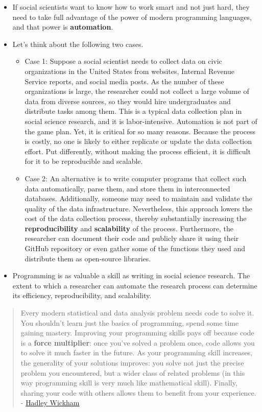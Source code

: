 \documentclass[
]{book}
\begin{document}
\begin{itemize}
\item
  If social scientists want to know how to work smart and not just hard, they need to take full advantage of the power of modern programming languages, and that power is \textbf{automation}.
\item
  Let's think about the following two cases.

  \begin{itemize}
  \item
    Case 1: Suppose a social scientist needs to collect data on civic organizations in the United States from websites, Internal Revenue Service reports, and social media posts. As the number of these organizations is large, the researcher could not collect a large volume of data from diverse sources, so they would hire undergraduates and distribute tasks among them. This is a typical data collection plan in social science research, and it is labor-intensive. Automation is not part of the game plan. Yet, it is critical for so many reasons. Because the process is costly, no one is likely to either replicate or update the data collection effort. Put differently, without making the process efficient, it is difficult for it to be reproducible and scalable.
  \item
    Case 2: An alternative is to write computer programs that collect such data automatically, parse them, and store them in interconnected databases. Additionally, someone may need to maintain and validate the quality of the data infrastructure. Nevertheless, this approach lowers the cost of the data collection process, thereby substantially increasing the \textbf{reproducibility} and \textbf{scalability} of the process. Furthermore, the researcher can document their code and publicly share it using their GitHub repository or even gather some of the functions they used and distribute them as open-source libraries.
  \end{itemize}
\item
  Programming is as valuable a skill as writing in social science research. The extent to which a researcher can automate the research process can determine its efficiency, reproducibility, and scalability.
\end{itemize}

\begin{quote}
Every modern statistical and data analysis problem needs code to solve it. You shouldn't learn just the basics of programming, spend some time gaining mastery. Improving your programming skills pays off because code is a \textbf{force multiplier}: once you've solved a problem once, code allows you to solve it much faster in the future. As your programming skill increases, the generality of your solutions improves: you solve not just the precise problem you encountered, but a wider class of related problems (in this way programming skill is very much like mathematical skill). Finally, sharing your code with others allows them to benefit from your experience. - \href{https://imstat.org/2014/12/16/hadley-wickham-impact-the-world-by-being-useful/}{Hadley Wickham}
\end{quote}
\end{document}

